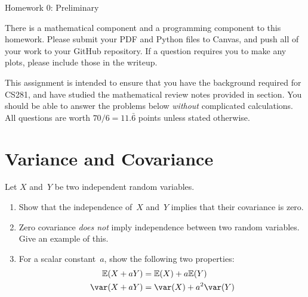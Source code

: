\documentclass[submit]{harvardml}
\newcommand{\E}{\mathbb{E}}
\begin{document}
\begin{center}
    {\Large Homework 0: Preliminary}
\end{center}


There is a mathematical component and a programming component to this homework.
Please submit your PDF and Python files to Canvas, and push all of your work
to your GitHub repository. If a question requires you to make any plots,
please include those in the writeup.

This assignment is intended to ensure that you have the background required for CS281,
and have studied the mathematical review notes provided in section.
You should be able to answer the problems below \textit{without} complicated calculations.
All questions are worth $70/6 = 11.\bar{6}$ points unless stated otherwise.

\newpage



\section*{Variance and Covariance}
\begin{problem}
Let $X$ and~$Y$ be two independent random variables.

\begin{enumerate}[label=(\alph*)]
\item Show that the independence of~$X$ and~$Y$ implies that their
covariance is zero.

\item Zero covariance \textit{does not} imply independence between two
      random variables. Give an example of this.

\item For a scalar constant~$a$, show the following two properties:
\begin{align*}
  \E(X + aY) &= \E(X) + a\E(Y)\\
  \var(X + aY) &= \var(X) + a^2\var(Y)
\end{align*}
\end{enumerate}
\end{problem}
\end{document}
